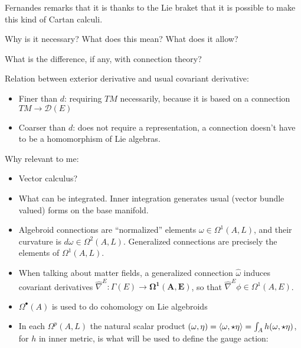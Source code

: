 {\color{gray}
Fernandes remarks that it is thanks to the Lie braket that it is possible to make this kind of Cartan calculi.

Why is it necessary? What does this mean? What does it allow?

What is the difference, if any, with connection theory?

Relation between exterior derivative and usual covariant derivative:
    \begin{itemize}
    
    \item Finer than $d$: requiring $TM$ necessarily, because it is based on a connection $TM \to \mathcal D(E)$
    
    \item Coarser than $d$: does not require a representation, a connection doesn't have to be a homomorphism of Lie algebras.
        
    \end{itemize}

Why relevant to me:
    \begin{itemize}
        
    \item Vector calculus?
    
    \item What can be integrated. Inner integration generates usual (vector bundle valued) forms on the base manifold.
    
    \item Algebroid connections are ``normalized'' elements $ \omega \in \Omega^1(A, L)$, and their curvature is $d\omega \in \Omega^2(A, L)$. Generalized connections are precisely the elements of $\Omega^1(A, L)$.
    
    \item When talking about matter fields, a generalized connection $\hat \omega$ induces covariant derivatives $\hat \nabla^E: \Gamma(E) \to \mathbf{\Omega^1(A, E)}$, so that $\hat \nabla^E \phi \in \Omega^1(A, E)$.
    
    \item $\Omega^\bullet(A)$ is used to do cohomology on Lie algebroids
    
    \item In each $\Omega^p(A, L)$ the natural scalar product $(\omega, \eta) = \left\langle \omega, \star \eta \right\rangle = \int_A h(\omega, \star \eta)$, for $h$ in inner metric, is what will be used to define the gauge action:
        

\end{itemize}}
